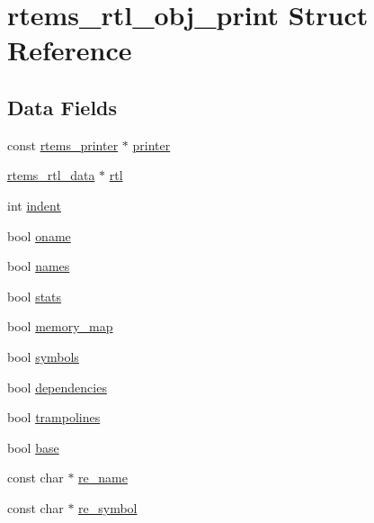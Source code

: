 \hypertarget{structrtems__rtl__obj__print}{}\section{rtems\+\_\+rtl\+\_\+obj\+\_\+print Struct Reference}
\label{structrtems__rtl__obj__print}
\subsection*{Data Fields}
\begin{DoxyCompactItemize}
\item 
const \mbox{\hyperlink{structrtems__printer}{rtems\+\_\+printer}} $\ast$ \mbox{\hyperlink{structrtems__rtl__obj__print_aced7e9c3cdec5f8fcddf2d44972394d0}{printer}}
\item 
\mbox{\hyperlink{structrtems__rtl__data}{rtems\+\_\+rtl\+\_\+data}} $\ast$ \mbox{\hyperlink{structrtems__rtl__obj__print_a9b185838ab7c8364c6e0d6c6bd48cc7d}{rtl}}
\item 
int \mbox{\hyperlink{structrtems__rtl__obj__print_a31b028c825a641f124f5c0bb00fc089f}{indent}}
\item 
bool \mbox{\hyperlink{structrtems__rtl__obj__print_a142230c63af19edd623e3f55818c9497}{oname}}
\item 
bool \mbox{\hyperlink{structrtems__rtl__obj__print_a665cfc31ebcfe9c351e0a099c9ac2505}{names}}
\item 
bool \mbox{\hyperlink{structrtems__rtl__obj__print_a60e55849695e6adf25a3716d9750b9cb}{stats}}
\item 
bool \mbox{\hyperlink{structrtems__rtl__obj__print_af8a74c71d6680674ae09f3990d4cccdb}{memory\+\_\+map}}
\item 
bool \mbox{\hyperlink{structrtems__rtl__obj__print_a28af9949514581e29040a1f43eb22840}{symbols}}
\item 
bool \mbox{\hyperlink{structrtems__rtl__obj__print_af8171d8ad2c3b24d1b289a7130f54a20}{dependencies}}
\item 
bool \mbox{\hyperlink{structrtems__rtl__obj__print_ad4855f11240d99950417825ab5cfe1cd}{trampolines}}
\item 
bool \mbox{\hyperlink{structrtems__rtl__obj__print_a1d439f97973c12eb2242ce39c2f786dd}{base}}
\item 
const char $\ast$ \mbox{\hyperlink{structrtems__rtl__obj__print_acb39eb30a5fd80a00393e2c334455733}{re\+\_\+name}}
\item 
const char $\ast$ \mbox{\hyperlink{structrtems__rtl__obj__print_ac8cb79e75659aca665a1db4fb9f9ed9a}{re\+\_\+symbol}}
\end{DoxyCompactItemize}


